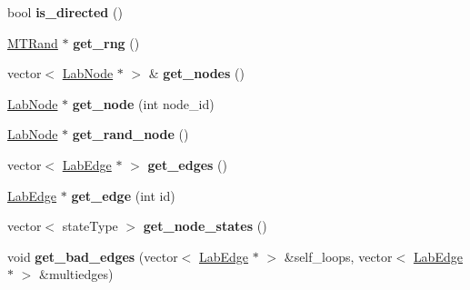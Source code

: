 \begin{DoxyCompactItemize}
\item 
\hypertarget{classelps_1_1_lab_network_a218fd8de96aeae41c200fa40aa24be61}{bool {\bfseries is\-\_\-directed} ()}\label{classelps_1_1_lab_network_a218fd8de96aeae41c200fa40aa24be61}

\item 
\hypertarget{classelps_1_1_lab_network_a30a0940d834169c7a40146359df78913}{\hyperlink{classelpm_1_1_m_t_rand}{M\-T\-Rand} $\ast$ {\bfseries get\-\_\-rng} ()}\label{classelps_1_1_lab_network_a30a0940d834169c7a40146359df78913}

\item 
\hypertarget{classelps_1_1_lab_network_a890cf3cf10c8da8bec4455e7dc9e3988}{vector$<$ \hyperlink{classelps_1_1_lab_node}{Lab\-Node} $\ast$ $>$ \& {\bfseries get\-\_\-nodes} ()}\label{classelps_1_1_lab_network_a890cf3cf10c8da8bec4455e7dc9e3988}

\item 
\hypertarget{classelps_1_1_lab_network_afe8db94a3ae34125b0f6cff6f858dfbb}{\hyperlink{classelps_1_1_lab_node}{Lab\-Node} $\ast$ {\bfseries get\-\_\-node} (int node\-\_\-id)}\label{classelps_1_1_lab_network_afe8db94a3ae34125b0f6cff6f858dfbb}

\item 
\hypertarget{classelps_1_1_lab_network_abbccc86255a171251092dc6d91d5fc7b}{\hyperlink{classelps_1_1_lab_node}{Lab\-Node} $\ast$ {\bfseries get\-\_\-rand\-\_\-node} ()}\label{classelps_1_1_lab_network_abbccc86255a171251092dc6d91d5fc7b}

\item 
\hypertarget{classelps_1_1_lab_network_a9367f81bc27a08181f62e3e3453e9659}{vector$<$ \hyperlink{classelps_1_1_lab_edge}{Lab\-Edge} $\ast$ $>$ {\bfseries get\-\_\-edges} ()}\label{classelps_1_1_lab_network_a9367f81bc27a08181f62e3e3453e9659}

\item 
\hypertarget{classelps_1_1_lab_network_af4143d27c86c2842a0072f5b9d5824be}{\hyperlink{classelps_1_1_lab_edge}{Lab\-Edge} $\ast$ {\bfseries get\-\_\-edge} (int id)}\label{classelps_1_1_lab_network_af4143d27c86c2842a0072f5b9d5824be}

\item 
\hypertarget{classelps_1_1_lab_network_af5c862cf17f8f43c3ca8f05d74d87b7b}{vector$<$ state\-Type $>$ {\bfseries get\-\_\-node\-\_\-states} ()}\label{classelps_1_1_lab_network_af5c862cf17f8f43c3ca8f05d74d87b7b}

\item 
\hypertarget{classelps_1_1_lab_network_a9251045c479f9b875d6f2f31c5aa8547}{void {\bfseries get\-\_\-bad\-\_\-edges} (vector$<$ \hyperlink{classelps_1_1_lab_edge}{Lab\-Edge} $\ast$ $>$ \&self\-\_\-loops, vector$<$ \hyperlink{classelps_1_1_lab_edge}{Lab\-Edge} $\ast$ $>$ \&multiedges)}\label{classelps_1_1_lab_network_a9251045c479f9b875d6f2f31c5aa8547}


\end{DoxyCompactItemize}
